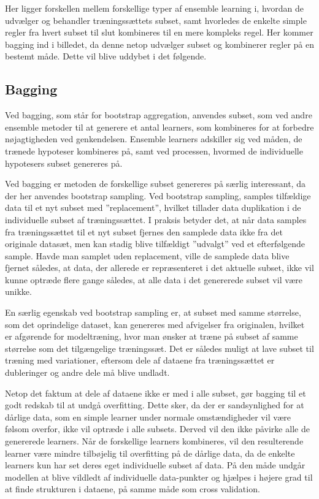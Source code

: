 Her ligger forskellen mellem forskellige typer af ensemble learning i, hvordan de udvælger og behandler træningssættets subset, samt hvorledes de enkelte simple regler fra hvert subset til slut kombineres til en mere kompleks regel. 
Her kommer bagging ind i billedet, da denne netop udvælger subset og kombinerer regler på en bestemt måde. Dette vil blive uddybet i det følgende. 

\subsection{Bagging}
Ved bagging, som står for bootstrap aggregation, anvendes subset, som ved andre ensemble metoder til at generere et antal learners, som kombineres for at forbedre nøjagtigheden ved genkendelsen. Ensemble learners adskiller sig ved måden, de trænede hypoteser kombineres på, samt ved processen, hvormed de individuelle hypotesers subset genereres på. 

Ved bagging er metoden de forskellige subset genereres på særlig interessant, da der her anvendes bootstrap sampling.
Ved bootstrap sampling, samples tilfældige data til et nyt subset med ”replacement”, hvilket tillader data duplikation i de individuelle subset af træningssættet. I praksis betyder det, at når data samples fra træningssættet til et nyt subset fjernes den samplede data ikke fra det originale datasæt, men kan stadig blive tilfældigt ”udvalgt” ved et efterfølgende sample. Havde man samplet uden replacement, ville de samplede data blive fjernet således, at data, der allerede er repræsenteret i det aktuelle subset, ikke vil kunne optræde flere gange således, at alle data i det genererede subset vil være unikke.

En særlig egenskab ved bootstrap sampling er, at subset med samme størrelse, som det oprindelige dataset, kan genereres med afvigelser fra originalen, hvilket er afgørende for modeltræning, hvor man ønsker at træne på subset af samme størrelse som det tilgængelige træningssæt. Det er således muligt at lave subset til træning med variationer, eftersom dele af dataene fra træningssættet er dubleringer og andre dele må blive undladt. 

Netop det faktum at dele af dataene ikke er med i alle subset, gør bagging til et godt redskab til at undgå overfitting. Dette sker, da der er sandsynlighed for at dårlige data, som en simple learner under normale omstændigheder vil være følsom overfor, ikke vil optræde i alle subsets. Derved vil den ikke påvirke alle de genererede learners. Når de forskellige learners kombineres, vil den resulterende learner være mindre tilbøjelig til overfitting på de dårlige data, da de enkelte learners kun har set deres eget individuelle subset af data. På den måde undgår modellen at blive vildledt af individuelle data-punkter og hjælpes i højere grad til at finde strukturen i dataene, på samme måde som cross validation.


